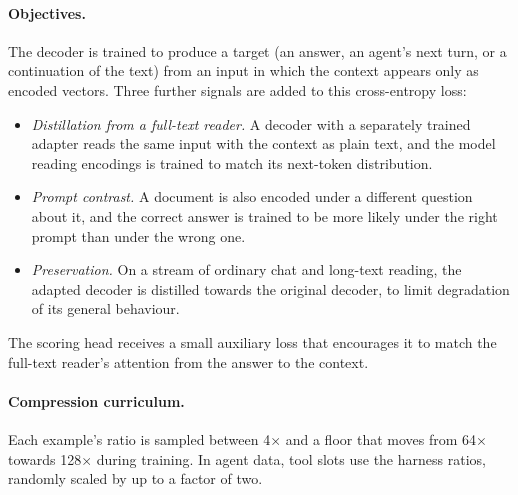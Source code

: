 \documentclass[11pt]{article}
\begin{document}
\paragraph{Objectives.}
The decoder is trained to produce a target (an answer, an agent's next turn, or a continuation of
the text) from an input in which the context appears only as encoded vectors. Three further signals
are added to this cross-entropy loss:
\begin{itemize}
\item \emph{Distillation from a full-text reader.} A decoder with a separately trained adapter reads
  the same input with the context as plain text, and the model reading encodings is trained to match
  its next-token distribution.
\item \emph{Prompt contrast.} A document is also encoded under a different question about it, and the
  correct answer is trained to be more likely under the right prompt than under the wrong one.
\item \emph{Preservation.} On a stream of ordinary chat and long-text reading, the adapted decoder is
  distilled towards the original decoder, to limit degradation of its general behaviour.
\end{itemize}
The scoring head receives a small auxiliary loss that encourages it to match the full-text
reader's attention from the answer to the context.

\paragraph{Compression curriculum.}
Each example's ratio is sampled between 4$\times$ and a floor that moves from 64$\times$ towards
128$\times$ during training. In agent data, tool slots use the harness ratios, randomly scaled by up
to a factor of two.
\end{document}
